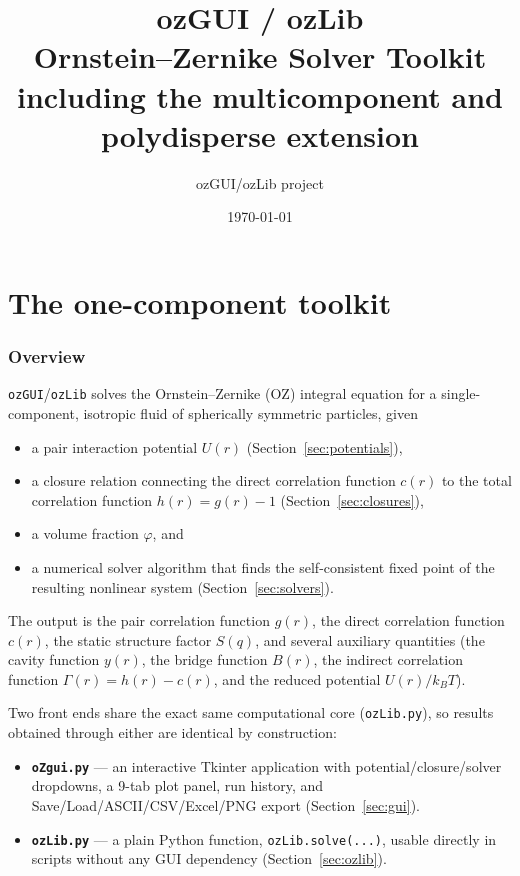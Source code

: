 \documentclass[11pt,a4paper]{article}
\title{\bfseries ozGUI / ozLib\\[2mm]
Ornstein--Zernike Solver Toolkit\\[1mm]
\large including the multicomponent and polydisperse extension}
\author{ozGUI/ozLib project}
\date{\today}
\newcommand{\code}[1]{\texttt{#1}}
\begin{document}
\maketitle
\tableofcontents
\clearpage
\part{The one-component toolkit}


\thispagestyle{empty}




\clearpage

\section{Overview}

\code{ozGUI}/\code{ozLib} solves the Ornstein--Zernike (OZ) integral equation for a
single-component, isotropic fluid of spherically symmetric particles, given
\begin{itemize}[nosep]
  \item a pair interaction potential $U(r)$ (Section~\ref{sec:potentials}),
  \item a closure relation connecting the direct correlation function $c(r)$ to
        the total correlation function $h(r)=g(r)-1$ (Section~\ref{sec:closures}),
  \item a volume fraction $\varphi$, and
  \item a numerical solver algorithm that finds the self-consistent fixed point
        of the resulting nonlinear system (Section~\ref{sec:solvers}).
\end{itemize}
The output is the pair correlation function $g(r)$, the direct correlation
function $c(r)$, the static structure factor $S(q)$, and several auxiliary
quantities (the cavity function $y(r)$, the bridge function $B(r)$, the
indirect correlation function $\Gamma(r)=h(r)-c(r)$, and the reduced potential
$U(r)/k_BT$).

Two front ends share the exact same computational core (\code{ozLib.py}), so
results obtained through either are identical by construction:
\begin{itemize}[nosep]
  \item \textbf{\code{oZgui.py}} --- an interactive Tkinter application with
        potential/closure/solver dropdowns, a 9-tab plot panel, run history,
        and Save/Load/ASCII/CSV/Excel/PNG export (Section~\ref{sec:gui}).
  \item \textbf{\code{ozLib.py}} --- a plain Python function,
        \code{ozLib.solve(...)}, usable directly in scripts without any GUI
        dependency (Section~\ref{sec:ozlib}).
\end{itemize}
\end{document}
